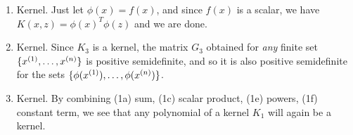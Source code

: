\begin{answer}
\begin{enumerate}

  \item Kernel. Just let $\phi(x) = f(x)$, and since $f(x)$ is a
    scalar, we have $K(x, z) = \phi(x)^T \phi(z)$ and we are done.

  \item Kernel. Since $K_3$ is a kernel, the matrix $G_3$ obtained
    for \emph{any} finite set $\{x^{(1)},\ldots,x^{({n})}\}$ is positive
    semidefinite, and so it is also positive semidefinite for the sets
    $\{\phi(x^{(1)}),\ldots,\phi(x^{({n})})\}$.

  \item Kernel. By combining (1a) sum, (1c) scalar product, (1e)
    powers, (1f) constant term, we see that any polynomial of a kernel
    $K_1$ will again be a kernel.

  \end{enumerate}

\end{answer}
